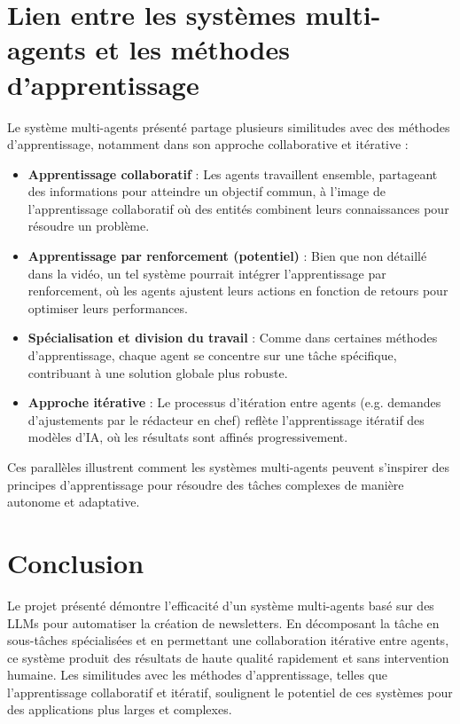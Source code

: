 \documentclass[a4paper,12pt]{article}
\begin{document}
	\section{Lien entre les systèmes multi-agents et les méthodes d'apprentissage}
	Le système multi-agents présenté partage plusieurs similitudes avec des méthodes d'apprentissage, notamment dans son approche collaborative et itérative :
	\begin{itemize}
		\item \textbf{Apprentissage collaboratif} : Les agents travaillent ensemble, partageant des informations pour atteindre un objectif commun, à l'image de l'apprentissage collaboratif où des entités combinent leurs connaissances pour résoudre un problème.
		\item \textbf{Apprentissage par renforcement (potentiel)} : Bien que non détaillé dans la vidéo, un tel système pourrait intégrer l'apprentissage par renforcement, où les agents ajustent leurs actions en fonction de retours pour optimiser leurs performances.
		\item \textbf{Spécialisation et division du travail} : Comme dans certaines méthodes d'apprentissage, chaque agent se concentre sur une tâche spécifique, contribuant à une solution globale plus robuste.
		\item \textbf{Approche itérative} : Le processus d'itération entre agents (e.g. demandes d'ajustements par le rédacteur en chef) reflète l'apprentissage itératif des modèles d'IA, où les résultats sont affinés progressivement.
	\end{itemize}
	Ces parallèles illustrent comment les systèmes multi-agents peuvent s'inspirer des principes d'apprentissage pour résoudre des tâches complexes de manière autonome et adaptative.
	
	\section{Conclusion}
	Le projet présenté démontre l'efficacité d'un système multi-agents basé sur des LLMs pour automatiser la création de newsletters. En décomposant la tâche en sous-tâches spécialisées et en permettant une collaboration itérative entre agents, ce système produit des résultats de haute qualité rapidement et sans intervention humaine. Les similitudes avec les méthodes d'apprentissage, telles que l'apprentissage collaboratif et itératif, soulignent le potentiel de ces systèmes pour des applications plus larges et complexes.
	
	\newpage
\end{document}
